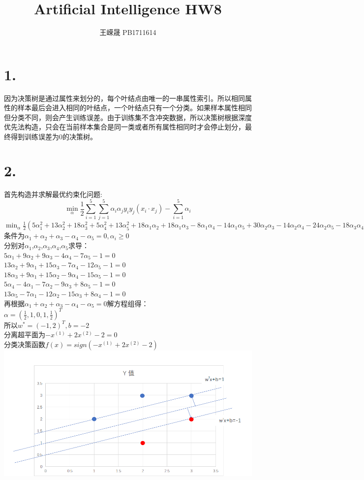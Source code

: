 \documentclass{article}
\title{Artificial Intelligence HW8}
\author{王嵘晟 \quad PB1711614}
\date{}
\begin{document}
	\maketitle
	\section*{1.}
	因为决策树是通过属性来划分的，每个叶结点由唯一的一串属性索引。所以相同属性的样本最后会进入相同的叶结点，一个叶结点只有一个分类。如果样本属性相同但分类不同，则会产生训练误差。由于训练集不含冲突数据，所以决策树根据深度优先法构造，只会在当前样本集合是同一类或者所有属性相同时才会停止划分，最终得到训练误差为0的决策树。
	\section*{2.}
	首先构造并求解最优约束化问题:
	$$\min_{\alpha}\frac{1}{2}\sum_{i=1}^{5}\sum_{j=1}^{5}\alpha_{i}\alpha_{j}y_{i}y_{j}(x_{i}\cdot x_{j})-\sum_{i=1}^{5}\alpha_{i}$$
	$\min_{\alpha}\frac{1}{2}(5\alpha_{1}^{2}+13\alpha_{2}^{2}+18\alpha_{3}^{2}+5\alpha_{4}^{2}+13\alpha_{5}^{2}+18\alpha_{1}\alpha_{2}+18\alpha_{1}\alpha_{3}-8\alpha_{1}\alpha_{4}-14\alpha_{1}\alpha_{5}+30\alpha_{2}\alpha_{3}-14\alpha_{2}\alpha_{4}-24\alpha_{2}\alpha_{5}-18\alpha_{3}\alpha_{4}-30\alpha_{3}\alpha_{5}+16\alpha_{4}\alpha_{5})-(\alpha_{1}+\alpha_{2}+\alpha_{3}+\alpha_{4}+\alpha_{5})$\\
	条件为$\alpha_{1}+\alpha_{2}+\alpha_{3}-\alpha_{4}-\alpha_{5}=0, \alpha_{i}\ge 0$\\
	分别对$\alpha_{1}$,$\alpha_{2}$,$\alpha_{3}$,$\alpha_{4}$,$\alpha_{5}$求导：\\
	$5\alpha_{1}+9\alpha_{2}+9\alpha_{3}-4\alpha_{4}-7\alpha_{5}-1=0$\\
	$13\alpha_{2}+9\alpha_{1}+15\alpha_{3}-7\alpha_{4}-12\alpha_{5}-1=0$\\
	$18\alpha_{3}+9\alpha_{1}+15\alpha_{2}-9\alpha_{4}-15\alpha_{5}-1=0$\\
	$5\alpha_{4}-4\alpha_{1}-7\alpha_{2}-9\alpha_{3}+8\alpha_{5}-1=0$\\
	$13\alpha_{5}-7\alpha_{1}-12\alpha_{2}-15\alpha_{3}+8\alpha_{4}-1=0$\\
	再根据$\alpha_{1}+\alpha_{2}+\alpha_{3}-\alpha_{4}-\alpha_{5}=0$解方程组得：\\
	$\alpha=(\frac{1}{2},1,0,1,\frac{1}{2})^{T}$\\
	所以$w^{*}=(-1,2)^{T},b=-2$\\
	分离超平面为$-x^{(1)}+2x^{(2)}-2=0$\\
	分类决策函数$f(x)=sign(-x^{(1)}+2x^{(2)}-2)$\\
	\includegraphics*[scale = 0.45]{1.png}
\end{document}
